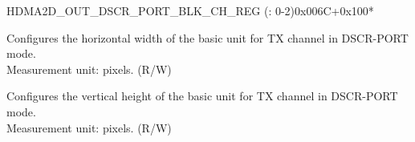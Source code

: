 \begin{register}{H}{DMA2D\_OUT\_DSCR\_PORT\_BLK\_CH\_REG (: 0-2)}{0x006C+0x100*}\label{regdesc:DMA2DOUTDSCRPORTBLKCHNREG}
%
%
%
\regnewline%
\begin{regdesc}\begin{reglist}
\label{fielddesc:DMA2DOUTDSCRPORTBLKHCHN}\item [DMA2D\_OUT\_DSCR\_PORT\_BLK\_H\_CH\regindex{n}] Configures the horizontal width of the basic unit for TX channel  in DSCR-PORT mode.\\ Measurement unit: pixels.  (R/W)
\label{fielddesc:DMA2DOUTDSCRPORTBLKVCHN}\item [DMA2D\_OUT\_DSCR\_PORT\_BLK\_V\_CH\regindex{n}] Configures the vertical height of the basic unit for TX channel  in DSCR-PORT mode.\\ Measurement unit: pixels.  (R/W)
\end{reglist}\end{regdesc}
\end{register}


